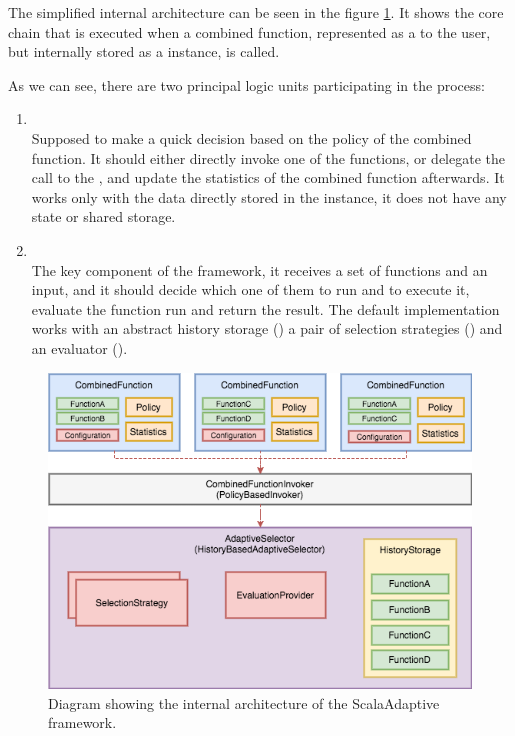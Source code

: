 The simplified internal architecture can be seen in the figure \ref{fig:internal_architecture}. It shows the core chain that is executed when a combined function, represented as a  to the user, but internally stored as a  instance, is called.

As we can see, there are two principal logic units participating in the process:

\begin{enumerate}
	\item \textbf{} \\
	Supposed to make a quick decision based on the policy of the combined function. It should either directly invoke one of the functions, or delegate the call to the , and update the statistics of the combined function afterwards. It works only with the data directly stored in the  instance, it does not have any state or shared storage.
	\item \textbf{} \\
	The key component of the framework, it receives a set of functions and an input, and it should decide which one of them to run and to execute it, evaluate the function run and return the result. The default implementation works with an abstract history storage () a pair of selection strategies () and an evaluator ().
\end{enumerate}

\begin{figure}[h!]
	\captionsetup{justification=centering,margin=0.5cm}
	\centerline{\mbox{\includegraphics[width=140mm]{./img/internal_architecture.png}}}
	\caption{Diagram showing the internal architecture of the ScalaAdaptive framework.}
	\label{fig:internal_architecture}
\end{figure}

